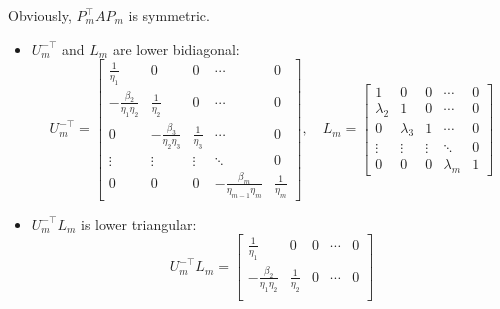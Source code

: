 Obviously, $P_m^\top A P_m$ is symmetric.
\begin{itemize}
    \item $U_m^{-\top}$ and $L_m$ are lower bidiagonal:
          \[
              U_m^{-\top} =
              \begin{bmatrix}
                  \frac{1}{\eta_1}               & 0                              & 0                & \cdots                             & 0                \\
                  -\frac{\beta_2}{\eta_1 \eta_2} & \frac{1}{\eta_2}               & 0                & \cdots                             & 0                \\
                  0                              & -\frac{\beta_3}{\eta_2 \eta_3} & \frac{1}{\eta_3} & \cdots                             & 0                \\
                  \vdots                         & \vdots                         & \vdots           & \ddots                             & 0                \\
                  0                              & 0                              & 0                & -\frac{\beta_m}{\eta_{m-1} \eta_m} & \frac{1}{\eta_m}
              \end{bmatrix},
              \quad
              L_m =
              \begin{bmatrix}
                  1         & 0         & 0      & \cdots    & 0 \\
                  \lambda_2 & 1         & 0      & \cdots    & 0 \\
                  0         & \lambda_3 & 1      & \cdots    & 0 \\
                  \vdots    & \vdots    & \vdots & \ddots    & 0 \\
                  0         & 0         & 0      & \lambda_m & 1
              \end{bmatrix}
          \]
    \item $U_m^{-\top} L_m$ is lower triangular:
          \[
              U_m^{-\top} L_m =
              \begin{bmatrix}
                  \frac{1}{\eta_1}               & 0                              & 0                & \cdots                             & 0                \\
                  -\frac{\beta_2}{\eta_1 \eta_2} & \frac{1}{\eta_2}               & 0                & \cdots                             & 0                \\

\end{bmatrix}\]
\end{itemize}
